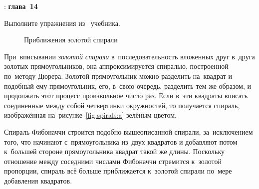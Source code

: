 



\WhatToReadSection
\textcite{Stroustrup:2016:ru}: \textbf{глава~14}



\ExercisesSection
\begin{exercise}
\item Выполните упражнения из~ учебника.

\begin{figure}[ht]
    {\centering
        \hfill
        \hfill
        \hfill
    }
    \caption{Приближения золотой спирали}
    \label{fig:spirals}
\end{figure}

\item При~вписывании \emph{золотой спирали} в~последовательность вложенных друг в~друга золотых прямоугольников, она аппроксимируется спиралью, построенной по~методу Дюрера. Золотой прямоугольник можно разделить на~квадрат и подобный ему прямоугольник, его, в~свою очередь, разделить тем же образом, и продолжать этот процесс произвольное число раз. Если в~эти квадраты вписать соединенные между собой четвертинки окружностей, то получается спираль, изображённая на~рисунке~\ref{fig:spirals:a} зелёным цветом.

\smallskip

Спираль Фибоначчи строится подобно вышеописанной спирали, за~исключением того, что начинают с~прямоугольника из~двух квадратов и добавляют потом к~большей стороне прямоугольника квадрат такой же длины. Поскольку отношение между соседними числами Фибоначчи стремится к~золотой пропорции, спираль всё больше приближается к~золотой спирали по~мере добавления квадратов.


\end{exercise}
